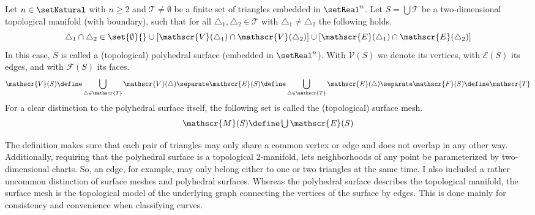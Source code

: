 \documentclass{stdlocal}
\begin{document}
  \begin{definition}
    Let $n\in\setNatural$ with $n\geq 2$ and $\mathscr{T}\neq\emptyset$ be a finite set of triangles embedded in $\setReal^n$.
    Let $S=\bigcup\mathscr{T}$ be a two-dimensional topological manifold (with boundary), such that for all $\triangle_1,\triangle_2\in\mathscr{T}$ with $\triangle_1\neq\triangle_2$ the following holds.
    \[
      \triangle_1\cap\triangle_2 \in \set{\emptyset}{} \cup [\mathscr{V}(\triangle_1)\cap\mathscr{V}(\triangle_2)] \cup [\mathscr{E}(\triangle_1)\cap\mathscr{E}(\triangle_2)]
    \]
    In this case, $S$ is called a (topological) polyhedral surface (embedded in $\setReal^n$).
    With $\mathscr{V}(S)$ we denote its vertices, with $\mathscr{E}(S)$ its edges, and with $\mathscr{F}(S)$ its faces.
    \[
      \mathscr{V}(S) \define \bigcup_{\triangle\in\mathscr{T}} \mathscr{V}(\triangle)
      \separate
      \mathscr{E}(S) \define \bigcup_{\triangle\in\mathscr{T}} \mathscr{E}(\triangle)
      \separate
      \mathscr{F}(S) \define \mathscr{T}
    \]
    For a clear distinction to the polyhedral surface itself, the following set is called the (topological) surface mesh.
    \[
      \mathscr{M}(S) \define \textstyle\bigcup \mathscr{E}(S)
    \]
  \end{definition}
  The definition makes sure that each pair of triangles may only share a common vertex or edge and does not overlap in any other way.
  Additionally, requiring that the polyhedral surface is a topological 2-manifold, lets neighborhoods of any point be parameterized by two-dimensional charts.
  So, an edge, for example, may only belong either to one or two triangles at the same time.
  I also included a rather uncommon distinction of surface meshes and polyhedral surfaces.
  Whereas the polyhedral surface describes the topological manifold, the surface mesh is the topological model of the underlying graph connecting the vertices of the surface by edges.
  This is done mainly for consistency and convenience when classifying curves.
\end{document}
